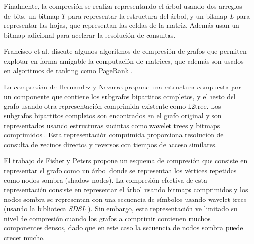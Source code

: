 

Finalmente, la compresión se realiza representando el árbol usando dos arreglos de bits, un bitmap $T$ para representar la estructura del árbol, y un bitmap $L$ para representar las hojas, que representan las celdas de la matriz. Además usan un bitmap adicional para acelerar la resolución de consultas. 


 Francisco et al. \cite{francisco2018exploiting} discute algunos algoritmos de compresión de grafos que permiten explotar en forma amigable la computación de matrices, que además son usados en algoritmos de ranking como PageRank \cite{page1999pagerank}.


La compresión de Hernandez y Navarro \cite{hernandez2012compressed} propone una estructura compuesta por un componente que contiene los subgrafos bipartitos completos, y el resto del grafo usando otra representación comprimida existente como k2tree. Los subgrafos bipartitos completos son encontrados en el grafo original y son representados usando estructuras sucintas como wavelet trees y bitmaps comprimidos \cite{gbmp2014sea}. Esta representación comprimida proporciona resolución de consulta de vecinos directos y reversos con tiempos de acceso similares.






El trabajo de Fisher y Peters \cite{FISCHER201639} propone un esquema de compresión que consiste en representar el grafo como un árbol donde se representan los vértices repetidos como nodos sombra (shadow nodes). La compresión efectiva de esta representación consiste en representar el árbol usando bitmaps comprimidos y los nodos sombra se representan con una secuencia de símbolos usando wavelet trees (usando la biblioteca \textit{SDSL} \cite{gbmp2014sea}). Sin embargo, esta representación ve limitado su nivel de compresión cuando los grafos a comprimir contienen muchos componentes densos, dado que en este caso la secuencia de nodos sombra puede crecer mucho.   

